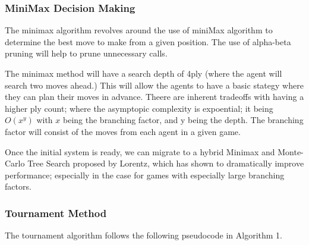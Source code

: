 \documentclass[12pt,a4paper]{article}
\begin{document}
\subsubsection{MiniMax Decision Making}

The minimax algorithm revolves around the use of miniMax algorithm to determine the best move to make from a given position. The use of alpha-beta pruning will help to prune unnecessary calls.

The minimax method will have a search depth of 4ply (where the agent will search two moves ahead.) This will allow the agents to have a basic stategy where they can plan their moves in advance. Theere are inherent tradeoffs with having a higher ply count; where the asymptopic complexity is expoential; it being $O(x^y)$ with $x$ being the branching factor, and y being the depth. The branching factor will consist of the moves from each agent in a given game.

Once the initial system is ready, we can migrate to a hybrid Minimax and  Monte-Carlo Tree Search proposed by Lorentz, which has shown to dramatically improve performance; especially in the case for games with especially large branching factors.

\subsubsection{Tournament Method}

The tournament algorithm follows the following pseudocode in Algorithm 1.
\end{document}
